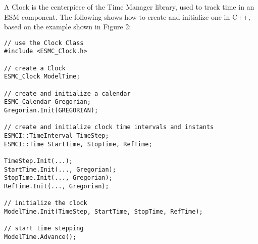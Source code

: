 
A Clock is the centerpiece of the Time Manager library, used to track time
in an ESM component.  The following shows how to create and initialize one
in C++, based on the example shown in Figure 2:

\begin{verbatim}
// use the Clock Class
#include <ESMC_Clock.h>

// create a Clock
ESMC_Clock ModelTime;

// create and initialize a calendar
ESMC_Calendar Gregorian;
Gregorian.Init(GREGORIAN);

// create and initialize clock time intervals and instants
ESMCI::TimeInterval TimeStep;
ESMCI::Time StartTime, StopTime, RefTime;

TimeStep.Init(...);
StartTime.Init(..., Gregorian);
StopTime.Init(..., Gregorian);
RefTime.Init(..., Gregorian);

// initialize the clock
ModelTime.Init(TimeStep, StartTime, StopTime, RefTime);

// start time stepping
ModelTime.Advance();
\end{verbatim}
